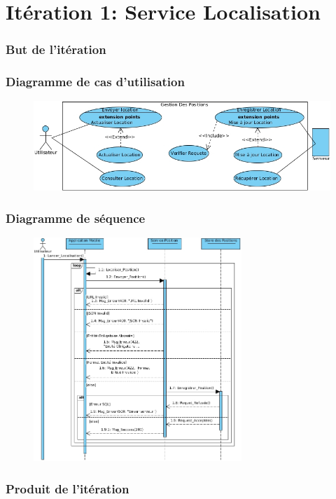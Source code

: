 \documentclass{beamer}
\begin{document}
\section{Itération 1: Service Localisation}
\begin{frame}
    \frametitle{But de l'itération}
\end{frame}
\begin{frame}
    \frametitle{Diagramme de cas d'utilisation}
    \begin{figure}
        \includegraphics[width=1\textwidth]{./diagrams/sprint1-webservices-usecase.jpg}
    \end{figure}
\end{frame}
\begin{frame}
    \frametitle{Diagramme de séquence}
    \begin{figure}
        \includegraphics[width=0.7\textwidth]{./diagrams/sprint1-webservices-post-sequence.jpg}
    \end{figure}
\end{frame}
\begin{frame}
    \frametitle{Produit de l'itération}
\end{frame}
\end{document}
